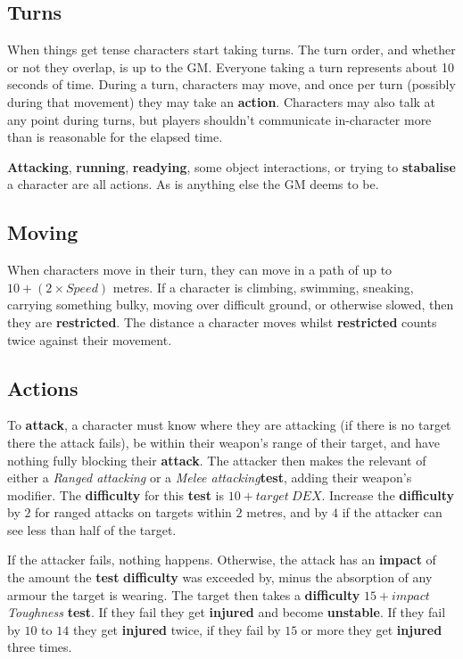 \documentclass[11pt]{article}
\begin{document}
\begin{multicols}{3}
  \subsection*{Turns}

  When things get tense characters start taking turns. The turn order, and
  whether or not they overlap, is up to the GM. Everyone taking a turn
  represents about 10 seconds of time. During a turn, characters may move, and
  once per turn (possibly during that movement) they may take an 
  \textbf{action​}. Characters may also talk at any point during turns, but
  players shouldn't communicate in-character more than is reasonable for the
  elapsed time.
  
  \textbf{Attacking}, \textbf{running}, \textbf{readying}, some object
  interactions, or trying to \textbf{stabalise} a character are all actions. As
  is anything else the GM deems to be.
  

  \subsection*{Moving}

  When characters move in their turn, they can move in a path of up to
  $10 + (2 \times Speed)$ metres. If a character is climbing, swimming,
  sneaking, carrying something bulky, moving over difficult ground, or otherwise
  slowed, then they are \textbf{restricted}. The distance a character moves
  whilst \textbf{restricted} counts twice against their movement.

  \subsection*{Actions}

  To \textbf{attack}, a character must know where they are attacking (if there
  is no target there the attack fails), be within their weapon's range of their
  target, and have nothing fully blocking their \textbf{attack}. The attacker
  then makes the relevant of either a \textit{​Ranged attacking​} or a
  \textit{​Melee attacking​​}  \textbf{test​}, adding their weapon's modifier. The
  \textbf{difficulty} for this ​\textbf{test​} is $10 + target\:DEX$. Increase the
  \textbf{difficulty} by $2$ for ranged attacks on targets within $2$ metres,
  and by $4$ if the attacker can see less than half of the target.

  If the attacker fails, nothing happens. Otherwise, the attack has an
  \textbf{impact} of the amount the \textbf{test} \textbf{difficulty} was
  exceeded by, minus the absorption of any armour the target is wearing. The
  target then takes a \textbf{difficulty} $15 + impact$ \textit{Toughness}
  \textbf{test}. If they fail they get \textbf{injured} and become
  \textbf{unstable}. If they fail by $10$ to $14$ they get \textbf{injured}
  twice, if they fail by $15$ or more they get \textbf{injured} three times.


\end{multicols}
\end{document}
